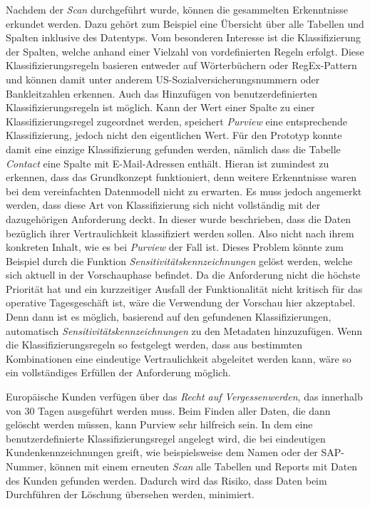 Nachdem der \textit{Scan} durchgeführt wurde, können die gesammelten Erkenntnisse erkundet werden. Dazu gehört zum Beispiel eine Übersicht über alle Tabellen und Spalten inklusive des Datentyps. Vom besonderen Interesse ist die Klassifizierung der Spalten, welche anhand einer Vielzahl von vordefinierten Regeln erfolgt. Diese Klassifizierungsregeln basieren entweder auf Wörterbüchern oder RegEx-Pattern und können damit unter anderem US-Sozialversicherungsnummern oder Bankleitzahlen erkennen. Auch das Hinzufügen von benutzerdefinierten Klassifizierungsregeln ist möglich. Kann der Wert einer Spalte zu einer Klassifizierungsregel zugeordnet werden, speichert \textit{Purview} eine entsprechende Klassifizierung, jedoch nicht den eigentlichen Wert. Für den Prototyp konnte damit eine einzige Klassifizierung gefunden werden, nämlich dass die Tabelle \textit{Contact} eine Spalte mit E-Mail-Adressen enthält. Hieran ist zumindest zu erkennen, dass das Grundkonzept funktioniert, denn weitere Erkenntnisse waren bei dem vereinfachten Datenmodell nicht zu erwarten. Es muss jedoch angemerkt werden, dass diese Art von Klassifizierung sich nicht vollständig mit der dazugehörigen Anforderung deckt. In dieser wurde beschrieben, dass die  Daten bezüglich ihrer Vertraulichkeit klassifiziert werden sollen. Also nicht nach ihrem konkreten Inhalt, wie es bei \textit{Purview} der Fall ist. Dieses Problem könnte zum Beispiel durch die Funktion \textit{Sensitivitätskennzeichnungen} gelöst werden, welche sich aktuell in der Vorschauphase befindet. Da die Anforderung nicht die höchste Priorität hat und ein kurzzeitiger Ausfall der Funktionalität nicht kritisch für das operative Tagesgeschäft ist, wäre die Verwendung der Vorschau hier akzeptabel. Denn dann ist es möglich, basierend auf den gefundenen Klassifizierungen, automatisch \textit{Sensitivitätskennzeichnungen} zu den Metadaten hinzuzufügen. Wenn die Klassifizierungsregeln so festgelegt werden, dass aus bestimmten Kombinationen eine eindeutige Vertraulichkeit abgeleitet werden kann, wäre so ein vollständiges Erfüllen der Anforderung möglich. 

Europäische Kunden verfügen über das \textit{Recht auf Vergessenwerden}, das innerhalb von 30 Tagen ausgeführt werden muss. Beim Finden aller Daten, die dann gelöscht werden müssen, kann Purview sehr hilfreich sein. In dem eine benutzerdefinierte Klassifizierungsregel angelegt wird, die bei eindeutigen Kundenkennzeichnungen greift, wie beispielsweise dem Namen oder der SAP-Nummer, können mit einem erneuten \textit{Scan} alle Tabellen und Reports mit Daten des Kunden gefunden werden. Dadurch wird das Risiko, dass Daten beim Durchführen der Löschung übersehen werden, minimiert.

